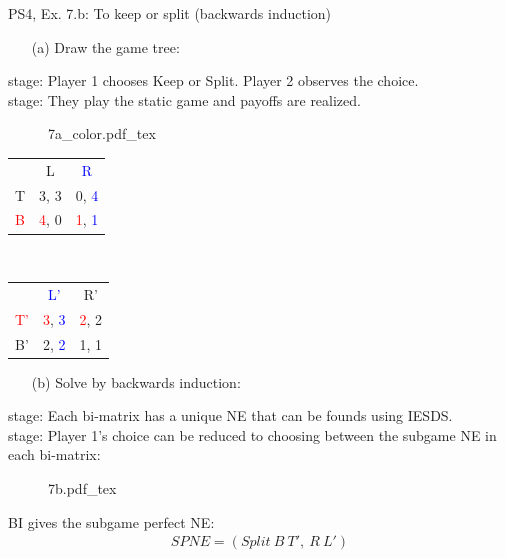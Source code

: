 \begin{frame}{PS4, Ex. 7.b: To keep or split (backwards induction)}
  \begin{multicols}{2}
    \begin{itemize}
      \item[(a)] Draw the game tree:
    \end{itemize}
     stage: Player 1 chooses Keep or Split. Player 2 observes the choice.\\\medskip
     stage: They play the static game and payoffs are realized.
    \begin{figure}[!h]
      \begin{center}
      \def\svgwidth{.5\columnwidth}
      {7a_color.pdf_tex}
      \end{center}
    \end{figure}
    \vspace{-14pt}
    \begin{table}
      \begin{tabular}{l|c|c|}
        \multicolumn{1}{c}{} & \multicolumn{1}{c}{L} & \multicolumn{1}{c}{\textcolor{blue}{R}} \\\cline{2-3}
        T & 3, 3 & 0, \textcolor{blue}{4} \\\cline{2-3}
        \textcolor{red}{B} & \textcolor{red}{4}, 0 & \textcolor{red}{1}, \textcolor{blue}{1} \\\cline{2-3}
        \end{tabular}\
        \begin{tabular}{l|c|c|}
          \multicolumn{1}{c}{} & \multicolumn{1}{c}{\textcolor{blue}{L'}} & \multicolumn{1}{c}{R'} \\\cline{2-3}
          \textcolor{red}{T'} & \textcolor{red}{3}, \textcolor{blue}{3} & \textcolor{red}{2}, 2 \\\cline{2-3}
          B' & 2, \textcolor{blue}{2} & 1, 1 \\\cline{2-3}
        \end{tabular}
    \end{table}
  \vfill\null \columnbreak
    \begin{itemize}
      \item[(b)] Solve by backwards induction:
    \end{itemize}
     stage: Each bi-matrix has a unique NE that can be founds using IESDS.\\\medskip
    \nth{1} stage: Player 1's choice can be reduced to choosing between the subgame NE in each bi-matrix:
    \begin{figure}[!h]
      \center
      \def\svgwidth{.5\columnwidth}
      {7b.pdf_tex}
    \end{figure}
    BI gives the subgame perfect NE:
    \begin{align*}
      SPNE=(Split\ B\ T',\ R\ L')
    \end{align*}
  \vfill\null
  \end{multicols}
\end{frame}

